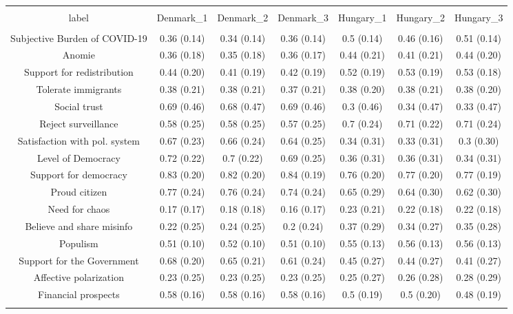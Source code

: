 
\begin{table}[!htbp] \centering 
  \caption{} 
  \label{} 
\begin{tabular}{@{\extracolsep{5pt}} ccccccc} 
\\[-1.8ex]\hline 
\hline \\[-1.8ex] 
label & Denmark\_1 & Denmark\_2 & Denmark\_3 & Hungary\_1 & Hungary\_2 & Hungary\_3 \\ 
\hline \\[-1.8ex] 
Subjective Burden of COVID-19 & 0.36 (0.14) & 0.34 (0.14) & 0.36 (0.14) & 0.5 (0.14) & 0.46 (0.16) & 0.51 (0.14) \\ 
Anomie & 0.36 (0.18) & 0.35 (0.18) & 0.36 (0.17) & 0.44 (0.21) & 0.41 (0.21) & 0.44 (0.20) \\ 
Support for redistribution & 0.44 (0.20) & 0.41 (0.19) & 0.42 (0.19) & 0.52 (0.19) & 0.53 (0.19) & 0.53 (0.18) \\ 
Tolerate immigrants & 0.38 (0.21) & 0.38 (0.21) & 0.37 (0.21) & 0.38 (0.20) & 0.38 (0.21) & 0.38 (0.20) \\ 
Social trust & 0.69 (0.46) & 0.68 (0.47) & 0.69 (0.46) & 0.3 (0.46) & 0.34 (0.47) & 0.33 (0.47) \\ 
Reject surveillance & 0.58 (0.25) & 0.58 (0.25) & 0.57 (0.25) & 0.7 (0.24) & 0.71 (0.22) & 0.71 (0.24) \\ 
Satisfaction with pol. system & 0.67 (0.23) & 0.66 (0.24) & 0.64 (0.25) & 0.34 (0.31) & 0.33 (0.31) & 0.3 (0.30) \\ 
Level of Democracy & 0.72 (0.22) & 0.7 (0.22) & 0.69 (0.25) & 0.36 (0.31) & 0.36 (0.31) & 0.34 (0.31) \\ 
Support for democracy & 0.83 (0.20) & 0.82 (0.20) & 0.84 (0.19) & 0.76 (0.20) & 0.77 (0.20) & 0.77 (0.19) \\ 
Proud citizen & 0.77 (0.24) & 0.76 (0.24) & 0.74 (0.24) & 0.65 (0.29) & 0.64 (0.30) & 0.62 (0.30) \\ 
Need for chaos & 0.17 (0.17) & 0.18 (0.18) & 0.16 (0.17) & 0.23 (0.21) & 0.22 (0.18) & 0.22 (0.18) \\ 
Believe and share misinfo & 0.22 (0.25) & 0.24 (0.25) & 0.2 (0.24) & 0.37 (0.29) & 0.34 (0.27) & 0.35 (0.28) \\ 
Populism & 0.51 (0.10) & 0.52 (0.10) & 0.51 (0.10) & 0.55 (0.13) & 0.56 (0.13) & 0.56 (0.13) \\ 
Support for the Government & 0.68 (0.20) & 0.65 (0.21) & 0.61 (0.24) & 0.45 (0.27) & 0.44 (0.27) & 0.41 (0.27) \\ 
Affective polarization & 0.23 (0.25) & 0.23 (0.25) & 0.23 (0.25) & 0.25 (0.27) & 0.26 (0.28) & 0.28 (0.29) \\ 
Financial prospects & 0.58 (0.16) & 0.58 (0.16) & 0.58 (0.16) & 0.5 (0.19) & 0.5 (0.20) & 0.48 (0.19) \\ 
\hline \\[-1.8ex] 
\end{tabular} 
\end{table} 
